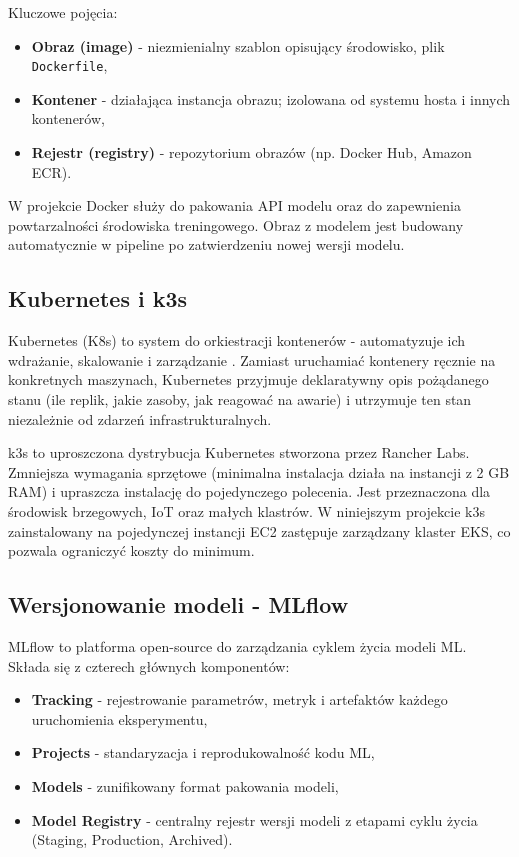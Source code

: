 Kluczowe pojęcia:
\begin{itemize}
  \item \textbf{Obraz (image)} - niezmienialny szablon opisujący środowisko, plik \texttt{Dockerfile},
  \item \textbf{Kontener} - działająca instancja obrazu; izolowana od systemu hosta i innych kontenerów,
  \item \textbf{Rejestr (registry)} - repozytorium obrazów (np. Docker Hub, Amazon ECR).
\end{itemize}

W projekcie Docker służy do pakowania API modelu oraz do zapewnienia powtarzalności środowiska treningowego. Obraz z modelem jest budowany automatycznie w pipeline po zatwierdzeniu nowej wersji modelu.

\subsection{Kubernetes i k3s}

Kubernetes (K8s) to system do orkiestracji kontenerów - automatyzuje ich wdrażanie, skalowanie i zarządzanie \cite{burns2016borg}. Zamiast uruchamiać kontenery ręcznie na konkretnych maszynach, Kubernetes przyjmuje deklaratywny opis pożądanego stanu (ile replik, jakie zasoby, jak reagować na awarie) i utrzymuje ten stan niezależnie od zdarzeń infrastrukturalnych.

k3s to uproszczona dystrybucja Kubernetes stworzona przez Rancher Labs. Zmniejsza wymagania sprzętowe (minimalna instalacja działa na instancji z 2 GB RAM) i upraszcza instalację do pojedynczego polecenia. Jest przeznaczona dla środowisk brzegowych, IoT oraz małych klastrów. W niniejszym projekcie k3s zainstalowany na pojedynczej instancji EC2 zastępuje zarządzany klaster EKS, co pozwala ograniczyć koszty do minimum.

\subsection{Wersjonowanie modeli - MLflow}

MLflow to platforma open-source do zarządzania cyklem życia modeli ML. Składa się z czterech głównych komponentów:

\begin{itemize}
  \item \textbf{Tracking} - rejestrowanie parametrów, metryk i artefaktów każdego uruchomienia eksperymentu,
  \item \textbf{Projects} - standaryzacja i reprodukowalność kodu ML,
  \item \textbf{Models} - zunifikowany format pakowania modeli,
  \item \textbf{Model Registry} - centralny rejestr wersji modeli z etapami cyklu życia (Staging, Production, Archived).
\end{itemize}

